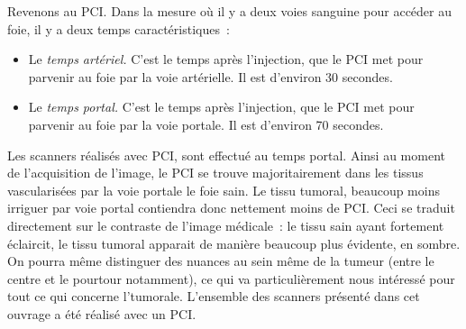\documentclass[main.tex]{subfiles}
\begin{document}
Revenons au PCI. Dans la mesure où il y a deux voies sanguine pour accéder au foie, il y a deux temps caractéristiques~:
\begin{itemize}
\item Le \emph{temps artériel.} C'est le temps après l'injection, que le PCI met pour parvenir au foie par la voie artérielle. Il est d'environ 30 secondes. 
\item Le \emph{temps portal.} C'est le temps après l'injection, que le PCI met pour parvenir au foie par la voie portale. Il est d'environ 70 secondes. 
\end{itemize}
Les scanners réalisés avec PCI, sont effectué au temps portal. Ainsi au moment de l'acquisition de l'image, le PCI se trouve majoritairement dans les tissus vascularisées par la voie portale \ie le foie sain. Le tissu tumoral, beaucoup moins irriguer par voie portal contiendra donc nettement moins de PCI. Ceci se traduit directement sur le contraste de l'image médicale~: le tissu sain ayant fortement éclaircit, le tissu tumoral apparait de manière beaucoup plus évidente, en sombre. On pourra même distinguer des nuances au sein même de la tumeur (entre le centre et le pourtour notamment), ce qui va particulièrement nous intéressé pour tout ce qui concerne l'\hetero tumorale. L'ensemble des scanners présenté dans cet ouvrage a été réalisé avec un PCI.
\end{document}
